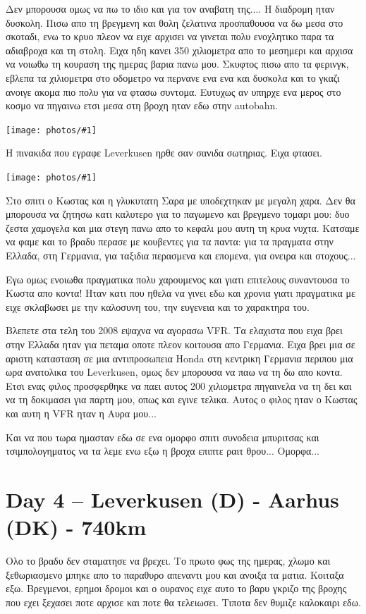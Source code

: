 \documentclass[11pt, letterpaper]{book}
\newcommand\photo[1]{\begin{center}\noindent\texttt{[image: photos/\#1]}\end{center}}
\begin{document}
Δεν μπορουσα ομως να πω το ιδιο και για τον αναβατη της.... Η διαδρομη ηταν δυσκολη. Πισω απο τη βρεγμενη και θολη ζελατινα προσπαθουσα να δω μεσα στο σκοταδι, ενω το κρυο πλεον να ειχε αρχισει να γινεται πολυ ενοχλητικο παρα τα αδιαβροχα και τη στολη. Ειχα ηδη κανει 350 χιλιομετρα απο το μεσημερι και αρχισα να νοιωθω τη κουραση της ημερας βαρια πανω μου. 
Σκυφτος πισω απο τα φερινγκ, εβλεπα τα χιλιομετρα στο οδομετρο να περνανε ενα ενα και δυσκολα και το γκαζι ανοιγε ακομα πιο πολυ για να φτασω συντομα. Ευτυχως αν υπηρχε ενα μερος στο κοσμο να πηγαινω ετσι μεσα στη βροχη ηταν εδω στην autobahn.

\photo{123.jpg}

Η πινακιδα που εγραφε Leverkusen ηρθε σαν σανιδα σωτηριας. Ειχα φτασει. 

\photo{124.jpg}

Στο σπιτι ο Κωστας και η γλυκυτατη Σαρα με υποδεχτηκαν με μεγαλη χαρα. 
Δεν θα μπορουσα να ζητησω κατι καλυτερο για το παγωμενο και βρεγμενο τομαρι μου: δυο ζεστα χαμογελα και μια στεγη πανω απο το κεφαλι μου αυτη τη κρυα νυχτα.
Κατσαμε να φαμε και το βραδυ περασε με κουβεντες για τα παντα: για τα πραγματα στην Ελλαδα, στη Γερμανια, για ταξιδια περασμενα και επομενα, για ονειρα και στοχους... 

Εγω ομως ενοιωθα πραγματικα πολυ χαρουμενος και γιατι επιτελους συναντουσα το Κωστα απο κοντα! Ηταν κατι που ηθελα να γινει εδω και χρονια γιατι πραγματικα με ειχε σκλαβωσει με την καλοσυνη του, την ευγενεια και το χαρακτηρα του. 

Βλεπετε στα τελη του 2008 εψαχνα να αγορασω VFR. Τα ελαχιστα που ειχα βρει στην Ελλαδα ηταν για πεταμα οποτε πλεον κοιτουσα απο Γερμανια. Ειχα βρει μια σε αριστη κατασταση σε μια αντιπροσωπεια Honda στη κεντρικη Γερμανια περιπου μια ωρα ανατολικα του Leverkusen, ομως δεν μπορουσα να παω να τη δω απο κοντα. 
Ετσι ενας φιλος προσφερθηκε να παει αυτος 200 χιλιομετρα πηγαινελα να τη δει και να τη δοκιμασει για παρτη μου, οπως και εγινε τελικα. 
Αυτος ο φιλος ηταν ο Κωστας και αυτη η VFR ηταν η Αυρα μου...

Και να που τωρα ημασταν εδω σε ενα ομορφο σπιτι συνοδεια μπυριτσας και τσιμπολογηματος να τα λεμε ενω εξω η βροχα επιπτε ραιτ θρου...
Ομορφα...

\chapter{Day 4 -- Leverkusen (D) - Aarhus (DK) - 740km}

Ολο το βραδυ δεν σταματησε να βρεχει. Το πρωτο φως της ημερας, χλωμο και ξεθωριασμενο μπηκε απο το παραθυρο απεναντι μου και ανοιξα τα ματια. Κοιταξα εξω. Βρεγμενοι, ερημοι δρομοι και ο ουρανος ειχε αυτο το βαρυ γκριζο της βροχης που εχει ξεχασει ποτε αρχισε και ποτε θα τελειωσει. Τιποτα δεν θυμιζε καλοκαιρι εδω.
\end{document}
